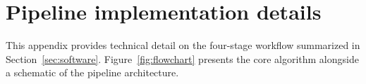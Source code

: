 \documentclass[12pt]{article}
\begin{document}
\FloatBarrier



\appendix

\section{Pipeline implementation details}
\label{app:pipeline}

This appendix provides technical detail on the four-stage workflow summarized in Section~\ref{sec:software}. Figure~\ref{fig:flowchart} presents the core algorithm alongside a schematic of the pipeline architecture.
\end{document}
